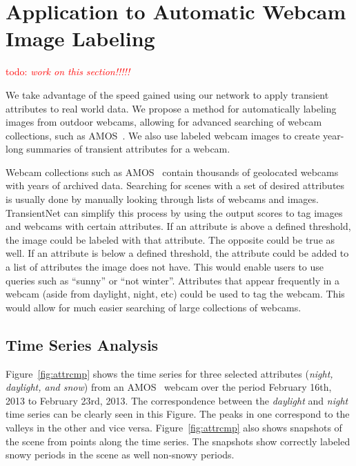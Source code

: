 \documentclass[10pt,twocolumn,letterpaper]{article}
\newcommand{\todo}[1]{\textcolor{red}{todo: {\em #1}}}
\newcommand{\figref}[1]{Figure~\ref{fig:#1}}
\begin{document}
\section{Application to Automatic Webcam Image Labeling}

\todo{work on this section!!!!!}

We take advantage of the speed gained using our network to apply transient
attributes to real world data.  We propose a method for automatically labeling
images from outdoor webcams, allowing for advanced searching of webcam
collections, such as AMOS~\cite{jacobs07amos}. We also use labeled webcam
images to create year-long summaries of transient attributes for a webcam.

Webcam collections such as AMOS~\cite{jacobs07amos} contain thousands of
geolocated webcams with years of archived data.  Searching for scenes with a
set of desired attributes is usually done by manually looking through lists of
webcams and images.  TransientNet can simplify this process by using the output
scores to tag images and webcams with certain attributes.  If an attribute is
above a defined threshold, the image could be labeled with that attribute.  The
opposite could be true as well.  If an attribute is below a defined threshold,
the attribute could be added to a list of attributes the image does not have.
This would enable users to use queries such as ``sunny'' or ``not winter''.
Attributes that appear frequently in a webcam (aside from daylight, night, etc)
could be used to tag the webcam.  This would allow for much easier searching of
large collections of webcams.

\subsection{Time Series Analysis}
\figref{attrcmp} shows the time series for three selected attributes
(\textit{night, daylight, and snow}) from an AMOS~\cite{jacobs07amos} webcam
over the period February 16th, 2013 to February 23rd, 2013.  The correspondence
between the \textit{daylight} and \textit{night} time series can be clearly seen
in this Figure.  The peaks in one correspond to the valleys in the other and
vice versa.  \figref{attrcmp} also shows snapshots of the scene from points
along the time series.  The snapshots show correctly labeled snowy periods in
the scene as well non-snowy periods.
\end{document}
